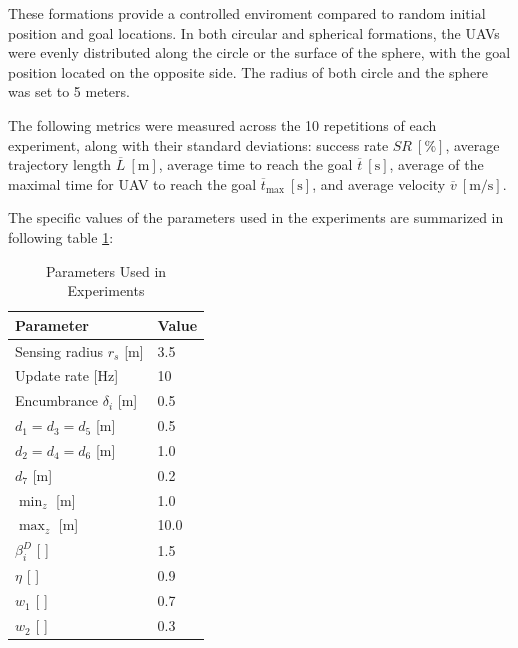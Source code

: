         These formations provide a controlled enviroment compared to random initial position and goal locations. 
        In both circular and spherical formations, the \ac{UAV}s were evenly distributed along the circle or the surface of the sphere, with the goal position located on the opposite side.
        The radius of both circle and the sphere was set to 5 meters.
        
        The following metrics were measured across the 10 repetitions of each experiment, along with their standard deviations: success rate \( SR \ [\%] \), average trajectory length \( \overline{L} \ [\mathrm{m}] \), 
        average time to reach the goal \( \overline{t} \ [\mathrm{s}] \), average of the maximal time for \ac{UAV} to reach the goal \( \overline{t}_{\text{max}} \ [\mathrm{s}] \), and average velocity \( \overline{v} \ [\mathrm{m/s}] \).

        The specific values of the parameters used in the experiments are summarized in following table \ref{tab:experiment_parameters}:
        \begin{table}[H]
            \centering
            \caption{Parameters Used in Experiments}
            \begin{tabular}{|l|l|}
                \hline
                Parameter & Value \\
                \hline
                \hline
                Sensing radius $r_s$ [m] & 3.5 \\ \hline
                Update rate [Hz] & 10 \\ \hline
                Encumbrance $\delta_i$ [m] & 0.5 \\ \hline
                $d_1 = d_3 = d_5$ [m] & 0.5 \\ \hline
                $d_2 = d_4 = d_6$ [m] & 1.0 \\ \hline
                $d_7$ [m] & 0.2  \\ \hline
                $\min_z$ [m] & 1.0 \\ \hline
                $\max_z$ [m] & 10.0 \\ \hline
                $\beta_i^D$ [ ] & 1.5  \\ \hline
                $\eta$ [ ] & 0.9  \\ \hline
                $w_1$ [ ] & 0.7 \\ \hline
                $w_2$ [ ] & 0.3 \\ \hline

            \end{tabular}
            \label{tab:experiment_parameters}
        \end{table}

